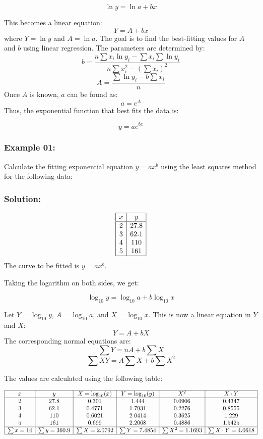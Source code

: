 \documentclass[12pt]{article}
\begin{document}
\[
\ln y = \ln a + bx
\]

This becomes a linear equation:
\[
Y = A + bx
\]
where \(Y = \ln y\) and \(A = \ln a\). The goal is to find the best-fitting values for \(A\) and \(b\) using linear regression. The parameters are determined by:
\[
b = \frac{n\sum x_i \ln y_i - \sum x_i \sum \ln y_i}{n\sum x_i^2 - (\sum x_i)^2}
\]
\[
A = \frac{\sum \ln y_i - b \sum x_i}{n}
\]
Once \(A\) is known, \(a\) can be found as:
\[
a = e^A
\]
Thus, the exponential function that best fits the data is:

\[
y = a e^{bx}
\]
\subsubsection*{\hspace{0.5cm}Example 01:}
Calculate the fitting exponential equation \( y = ax^b \) using the least squares method for the following data:
\subsubsection*{\hspace{0.5cm}Solution:}
\[
\begin{array}{|c|c|}
\hline
x & y \\
\hline
2 & 27.8 \\
3 & 62.1 \\
4 & 110 \\
5 & 161 \\
\hline
\end{array}
\]
The curve to be fitted is \( y = ax^b \).

Taking the logarithm on both sides, we get:

\[
\log_{10} y = \log_{10} a + b \log_{10} x
\]

Let \( Y = \log_{10} y \), \( A = \log_{10} a \), and \( X = \log_{10} x \).  
This is now a linear equation in \( Y \) and \( X \):
\[
Y = A + bX
\]
The corresponding normal equations are:
\[
\sum Y = nA + b \sum X
\]
\[
\sum XY = A \sum X + b \sum X^2
\]

The values are calculated using the following table:

\[
\begin{array}{|c|c|c|c|c|c|}
\hline
x & y & X = \log_{10}(x) & Y = \log_{10}(y) & X^2 & X \cdot Y \\
\hline
2 & 27.8 & 0.301 & 1.444 & 0.0906 & 0.4347 \\
3 & 62.1 & 0.4771 & 1.7931 & 0.2276 & 0.8555 \\
4 & 110 & 0.6021 & 2.0414 & 0.3625 & 1.229 \\
5 & 161 & 0.699 & 2.2068 & 0.4886 & 1.5425 \\
\hline
\sum x = 14 & \sum y = 360.9 & \sum X = 2.0792 & \sum Y = 7.4854 & \sum X^2 = 1.1693 & \sum X \cdot Y = 4.0618 \\
\hline
\end{array}
\]
\end{document}
